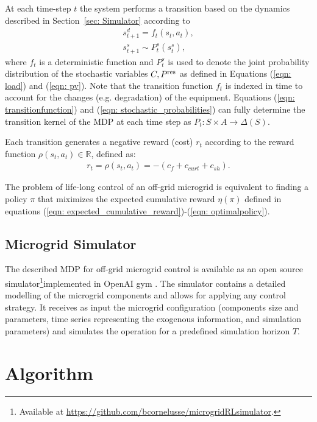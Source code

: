 \documentclass{article}
\begin{document}
    At each time-step $t$ the system performs a transition based on the dynamics described in Section~\ref{sec: Simulator} according to
    \begin{gather}
    s_{t+1}^{d} = f_{t}\left(s_t, a_t\right), \label{eqn: transitionfunction}\\
    s_{t+1}^{s} \sim P^{s}_{t}\left(s_t^{s}\right)\label{eqn: stochastic_probabilities},
    \end{gather}
    where $f_{t}$ is a deterministic function and $P^{s}_{t}$ is used to denote the joint probability distribution of the stochastic variables $C, P^\text{res}$ as defined in Equations (\ref{eqn: load}) and (\ref{eqn: pv}). Note that the transition function $f_{t}$ is indexed in time to account for the changes (e.g. degradation) of the equipment. Equations (\ref{eqn: transitionfunction}) and (\ref{eqn: stochastic_probabilities}) can fully determine the transition kernel of the MDP at each time step as $P_t: S \times A \rightarrow \Delta(S)$.
    
    Each transition generates a negative reward (cost) $r_t$ according to the reward function $\rho(s_t, a_t) \in \mathbb{R}$, defined as:
    \begin{gather}
    r_t = \rho(s_t, a_t) = -(c_f + c_{curt} + c_{sh}).\label{eqn: rewardfunction}
    \end{gather}
    

    The problem of life-long control of an off-grid microgrid is equivalent to finding a policy $\pi$ that miximizes the expected cumulative reward $\eta(\pi)$ defined in equations (\ref{eqn: expected_cumulative_reward})-(\ref{eqn: optimalpolicy}).

    \subsection{Microgrid Simulator}
    The described MDP for off-grid microgrid control is available as an open source simulator\footnote{Available at \url{https://github.com/bcornelusse/microgridRLsimulator}.}implemented in OpenAI gym \cite{brockman2016openai}. The simulator contains a detailed modelling of the microgrid components and allows for applying any control strategy. It receives as input the microgrid configuration (components size and parameters, time series representing the exogenous information, and simulation parameters) and simulates the operation for a predefined simulation horizon $T$.

\section{Algorithm} \label{sec: Algorithm}
        
\end{document}
